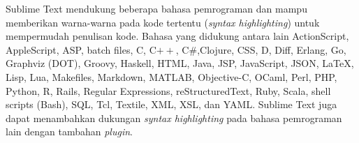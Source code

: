     Sublime Text mendukung beberapa bahasa pemrograman dan mampu memberikan warna-warna pada kode tertentu (\emph{syntax highlighting}) untuk mempermudah penulisan kode. Bahasa yang didukung antara lain ActionScript, AppleScript, ASP, batch files, C, C$++$, C\#,Clojure, CSS, D, Diff, Erlang, Go, Graphviz (DOT), Groovy, Haskell, HTML, Java, JSP, JavaScript, JSON, LaTeX, Lisp, Lua, Makefiles, Markdown, MATLAB, Objective-C, OCaml, Perl, PHP, Python, R, Rails, Regular Expressions, reStructuredText, Ruby, Scala, shell scripts (Bash), SQL, Tcl, Textile, XML, XSL, dan YAML. Sublime Text juga dapat menambahkan dukungan \emph{syntax highlighting} pada bahasa pemrograman lain dengan tambahan \emph{plugin}.

